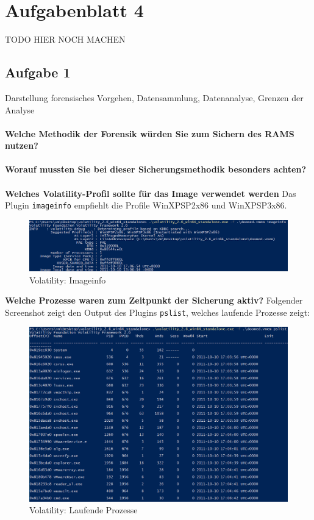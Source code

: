 \documentclass[
    a4paper,
    pagesize,
	pdftex,
    12pt,
]{scrartcl}
\begin{document}
\newpage
\section{Aufgabenblatt 4}

TODO HIER NOCH MACHEN

\subsection{Aufgabe 1}
Darstellung forensisches Vorgehen, Datensammlung, Datenanalyse, Grenzen der Analyse
\\ \\
\textbf{Welche Methodik der Forensik würden Sie zum Sichern des RAMS nutzen?}
\\ \\
\textbf{Worauf mussten Sie bei dieser Sicherungsmethodik besonders achten?}
\\ \\
\textbf{Welches Volatility-Profil sollte für das Image verwendet werden}
Das Plugin \lstinline[breaklines]|imageinfo| empfiehlt die Profile WinXPSP2x86 und WinXPSP3x86.
\begin{figure}[H]
	\centering
	\includegraphics[width=18cm]{vol-imageinfo.png}
	\caption{Volatility: Imageinfo}
	\label{fig:vol-imageinfo}
\end{figure} 
\textbf{Welche Prozesse waren zum Zeitpunkt der Sicherung aktiv?}
Folgender Screenshot zeigt den Output des Plugins \lstinline[breaklines]|pslist|, welches laufende Prozesse zeigt:
\begin{figure}[H]
	\centering
	\includegraphics[width=18cm]{vol-prozesse.png}
	\caption{Volatility: Laufende Prozesse}
	\label{fig:vol-prozesse}
\end{figure} 
\end{document}
